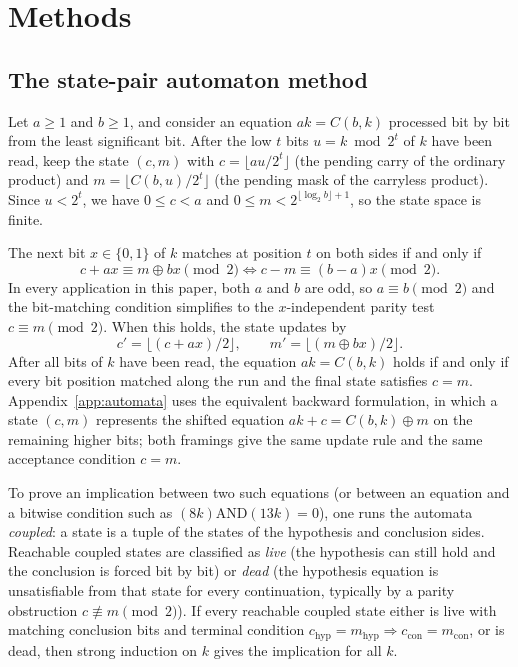 \documentclass[11pt]{article}
\begin{document}
\section{Methods}
\label{sec:methods}

\subsection{The state-pair automaton method}
Let $a \ge 1$ and $b \ge 1$, and consider an equation $ak = C(b,k)$ processed bit by bit from the least significant bit. After the low $t$ bits $u = k \bmod 2^t$ of $k$ have been read, keep the state $(c,m)$ with $c = \lfloor au/2^t \rfloor$ (the pending carry of the ordinary product) and $m = \lfloor C(b,u)/2^t \rfloor$ (the pending mask of the carryless product). Since $u < 2^t$, we have $0 \le c < a$ and $0 \le m < 2^{\lfloor \log_2 b \rfloor + 1}$, so the state space is finite.

The next bit $x \in \{0,1\}$ of $k$ matches at position $t$ on both sides if and only if
\[
  c + ax \equiv m \oplus bx \pmod{2}
  \iff c - m \equiv (b - a)x \pmod{2}.
\]
In every application in this paper, both $a$ and $b$ are odd, so $a \equiv b \pmod{2}$ and the bit-matching condition simplifies to the $x$-independent parity test $c \equiv m \pmod{2}$. When this holds, the state updates by
\[
  c' = \lfloor (c + ax)/2 \rfloor, \qquad m' = \lfloor (m \oplus bx)/2 \rfloor.
\]
After all bits of $k$ have been read, the equation $ak = C(b,k)$ holds if and only if every bit position matched along the run and the final state satisfies $c = m$. Appendix~\ref{app:automata} uses the equivalent backward formulation, in which a state $(c, m)$ represents the shifted equation $ak + c = C(b,k) \oplus m$ on the remaining higher bits; both framings give the same update rule and the same acceptance condition $c = m$.

To prove an implication between two such equations (or between an
equation and a bitwise condition such as $(8k) \mathbin{\mathrm{AND}}
(13k) = 0$), one runs the automata \emph{coupled}: a state is a tuple
of the states of the hypothesis and conclusion sides. Reachable
coupled states are classified as \emph{live} (the hypothesis can still
hold and the conclusion is forced bit by bit) or \emph{dead} (the
hypothesis equation is unsatisfiable from that state for every
continuation, typically by a parity obstruction $c \not\equiv m
\pmod 2$). If every reachable coupled state either is live with
matching conclusion bits and terminal condition $c_{\mathrm{hyp}} =
m_{\mathrm{hyp}} \Rightarrow c_{\mathrm{con}} = m_{\mathrm{con}}$, or is
dead, then strong induction on $k$ gives the implication for all $k$.
\end{document}
